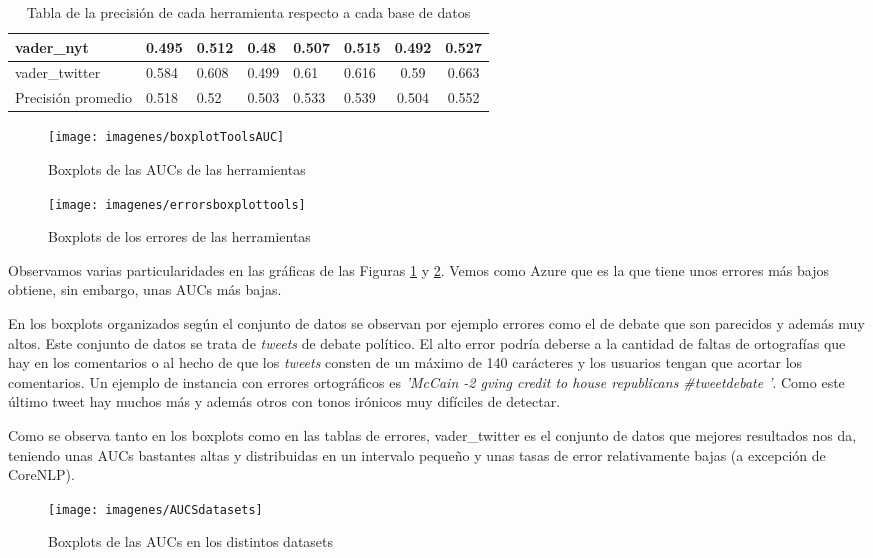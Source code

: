 \begin{table} [H]
{\begin{tabular}{|llllb{1.5cm}b{1.5cm}cc|}
			vader\_nyt & 0.495 & 0.512 & 0.48 & 0.507 & 0.515 & 0.492 &  \cellcolor{greentable}0.527 \\ \hline
			vader\_twitter & 0.584 & 0.608 & 0.499 & 0.61 & 0.616 & 0.59 & \cellcolor{greentable} 0.663 \\ \hline
			Precisión promedio & 0.518 & 0.52 & 0.503 & 0.533 & 0.539 & 0.504 &\cellcolor{greentable} 0.552 \\ \hline
		\end{tabular}
	}
	\caption{Tabla de la precisión de cada herramienta respecto a cada base de datos}
	\label{table:precission}
\end{table}

\newpage
\begin{figure} [H]
	\centering
	\texttt{[image: imagenes/boxplotToolsAUC]}
	\caption{Boxplots de las AUCs de las herramientas}
	\label{fig:boxplottoolsauc}
\end{figure}

\begin{figure} [H]
	\centering
	\texttt{[image: imagenes/errorsboxplottools]}
	\caption{Boxplots de los errores de las herramientas}
	\label{fig:errorsboxplottools}
\end{figure}

Observamos varias particularidades en las gráficas de las Figuras \ref{fig:boxplottoolsauc} y \ref{fig:errorsboxplottools}. Vemos como Azure que es la que tiene unos errores más bajos obtiene, sin embargo, unas AUCs más bajas. 

En los boxplots organizados según el conjunto de datos se observan por ejemplo errores como el de debate que son parecidos y además muy altos. Este conjunto de datos se trata de \textit{tweets} de debate político. El alto error podría deberse a la cantidad de faltas de ortografías que hay en los comentarios o al hecho de que los \textit{tweets} consten de un máximo de 140 carácteres y los usuarios tengan que acortar los comentarios. Un ejemplo de instancia con errores ortográficos es \textit{'McCain -2 gving credit to house republicans \#tweetdebate
'}. Como este último tweet hay muchos más y además otros con tonos irónicos muy difíciles de detectar.

Como se observa tanto en los boxplots como en las tablas de errores, vader\_twitter es el conjunto de datos que mejores resultados nos da, teniendo unas AUCs bastantes altas y distribuidas en un intervalo pequeño y unas tasas de error relativamente bajas (a excepción de CoreNLP).
\begin{figure} [H]
	\centering
	\texttt{[image: imagenes/AUCSdatasets]}
	\caption{Boxplots de las AUCs en los distintos datasets}
	\label{fig:aucsdatasets}
\end{figure}

